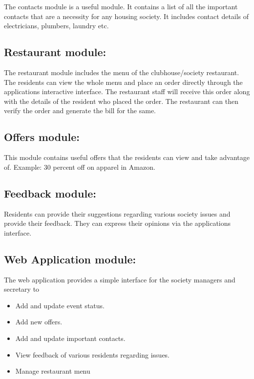 The contacts module is a useful module. It contains a list of all the important contacts that are a necessity for any housing society. It includes contact details of electricians, plumbers, laundry etc.

\subsection{Restaurant module:}
The restaurant module includes the menu of the clubhouse/society restaurant. The residents can view the whole menu and place an order directly through the applications interactive interface. The restaurant staff will receive this order along with the details of the resident who placed the order. The restaurant can then verify the order and generate the bill for the same.


\subsection{Offers module:}

This module contains useful offers that the residents can view and take advantage of. Example: 30 percent off on apparel in Amazon.

\subsection{Feedback module:}

Residents can provide their suggestions regarding various society issues and provide their feedback. They can express their opinions via the applications interface.

\subsection{Web Application module:}

The web application provides a simple interface for the society managers and secretary to

\begin{itemize}

\item	Add and update event status.

\item	Add new offers.

\item  Add and update important contacts.

\item  View feedback of various residents regarding issues.

\item	Manage restaurant menu

\end{itemize}

